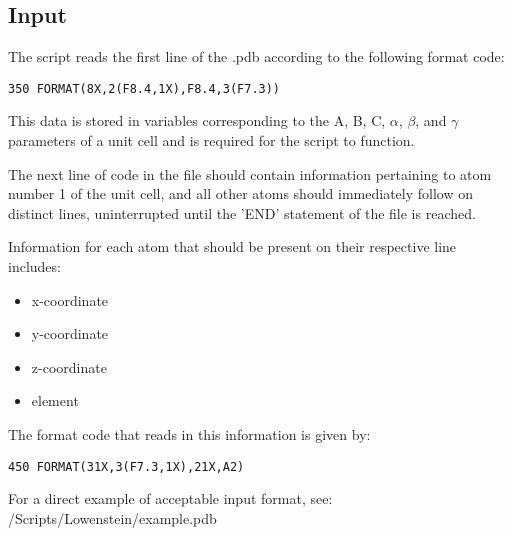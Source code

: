 \subsection{Input} \label{sec:Input}
The script reads the first line of the .pdb according to the following format code:

\begin{lstlisting}[firstnumber=184, caption=Lowenstein\_Script.f90]
    350 FORMAT(8X,2(F8.4,1X),F8.4,3(F7.3))
\end{lstlisting}

This data is stored in variables corresponding to the A, B, C, $\alpha$, $\beta$, and $\gamma$   
parameters of a unit cell and is required for the script to function.

The next line of code in the file should contain information pertaining to atom number 1 of the unit cell, and 
all other atoms should immediately follow on distinct lines, uninterrupted until the 'END' statement of the file is reached.

Information for each atom that should be present on their respective line includes:
\begin{itemize}
\item x-coordinate
\item y-coordinate
\item z-coordinate
\item element
\end{itemize}

The format code that reads in this information is given by:

\begin{lstlisting}[firstnumber=231, caption=Lowenstein\_Script.f90]
    450 FORMAT(31X,3(F7.3,1X),21X,A2)
\end{lstlisting}

For a direct example of acceptable input format, see:  /Scripts/Lowenstein/example.pdb


